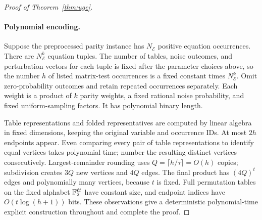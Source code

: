 \begin{proof}[Proof of Theorem~\ref{thm:ugc}]
\paragraph{Polynomial encoding.}
Suppose the preprocessed parity instance has $N_{\mathcal E}$ positive
equation occurrences.  There are $N_{\mathcal E}^k$ equation tuples.
The number of tables, noise outcomes, and perturbation vectors for each
tuple is fixed after the parameter choices above, so the number $h$ of
listed matrix-test occurrences is a fixed constant times
$N_{\mathcal E}^k$.  Omit
zero-probability outcomes and retain repeated occurrences separately.
Each weight is a product of $k$ parity weights, a fixed rational
noise probability, and fixed uniform-sampling factors.  It has
polynomial binary length.

Table representations and folded representatives are computed by linear
algebra in fixed dimensions, keeping the original variable and
occurrence IDs.  At most $2h$ endpoints appear.  Even comparing every
pair of table representations to identify equal vertices takes polynomial time; number
the resulting distinct vertices consecutively.
Largest-remainder rounding uses $Q=\lceil h/\tau\rceil=O(h)$ copies;
subdivision creates $3Q$ new vertices and $4Q$ edges.  The final
product has $(4Q)^t$ edges and polynomially many vertices, because
$t$ is fixed.  Full permutation tables on the fixed alphabet
$\mathbb F_2^{\ell t}$ have constant size, and endpoint indices have
$O(t\log(h+1))$ bits.  These observations give a deterministic
polynomial-time explicit construction throughout and complete the
proof.
\end{proof}
